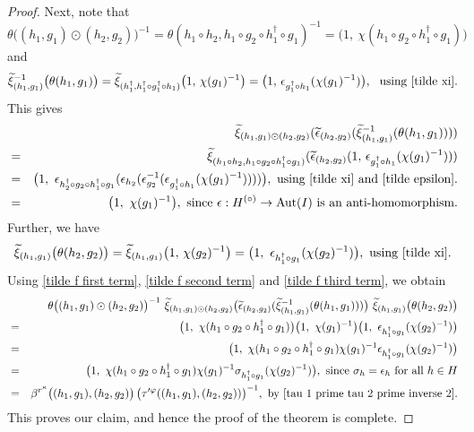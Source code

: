 \documentclass{jonasart}
\theoremstyle{plain}
\DeclareMathOperator{\Aut}{Aut}
\begin{document}
\begin{proof}
		Next, note that
		\begin{equation}\label{tilde f first term}
			\theta \big((h_1,g_1)\odot(h_2,g_2)\big)^{-1}=\theta(h_1\circ h_2,h_1\circ g_2\circ h_1^\dagger \circ g_1)^{-1}= \big(1, ~ \chi(h_1\circ g_2\circ h_1^\dagger \circ g_1)\big)
		\end{equation}
		and
		$$\widetilde{\xi}^{-1}_{(h_1,g_1)} \big(\theta(h_1,g_1)\big)= \widetilde{\xi}_{(h_1^\dagger,h_1^\dagger \circ g_1^\dagger\circ h_1)} \big(1,\, \chi(g_1)^{-1}\big)=
		\big(1,\,\epsilon_{g_1^\dagger\circ h_1}(\chi(g_1)^{-1}) \big),~~\text{using \eqref{tilde xi}.}
		$$
		This gives
		\begin{eqnarray}
			&& \widetilde{\xi}_{(h_1,g_1)\odot(h_2,g_2)}(\widetilde{\epsilon}_{(h_2,g_2)}(\widetilde{\xi}^{-1}_{(h_1,g_1)}(\theta(h_1,g_1)))) \nonumber\\
			&=&\widetilde{\xi}_{(h_1\circ h_2,h_1\circ g_2\circ h_1^\dagger \circ g_1)}(\widetilde{\epsilon}_{(h_2,g_2)}(1,\,\epsilon_{g_1^\dagger\circ h_1}(\chi(g_1)^{-1})))\nonumber\\
			&=&\big(1, ~ \epsilon_{h_2^\dagger\circ g_2\circ h_1^\dagger\circ g_1}(\epsilon_{h_2}(\epsilon^{-1}_{g_2}( \epsilon_{g_1^\dagger\circ h_1}(\chi(g_1)^{-1}))))\big),~\text{using \eqref{tilde xi} and \eqref{tilde epsilon}.}\nonumber\\
			&=& \big(1, ~\chi(g_1)^{-1}\big),~\textrm{since $\epsilon : H^{(\circ)} \rightarrow \Aut(I)$ is an anti-homomorphism}.\label{tilde f second term}
		\end{eqnarray}
		Further, we have
		\begin{equation}\label{tilde f third term}
			\widetilde{\xi}_{(h_1,g_1)} \big(\theta(h_2,g_2)\big) =\widetilde{\xi}_{(h_1,g_1)} \big(1,\, \chi(g_2)^{-1} \big)=\big(1, ~ \epsilon_{h_1^\dagger\circ g_1}(\chi(g_2)^{-1})\big),\text{ using \eqref{tilde xi}.}
		\end{equation}
		Using \eqref{tilde f first term}, \eqref{tilde f second term} and \eqref{tilde f third term}, we obtain
		\begin{eqnarray*}
			&& \theta \big((h_1,g_1)\odot(h_2,g_2)\big)^{-1} ~ \widetilde{\xi}_{(h_1,g_1)\odot(h_2,g_2)} \big(\widetilde{\epsilon}_{(h_2,g_2)}(\widetilde{\xi}^{-1}_{(h_1,g_1)}(\theta(h_1,g_1)))\big) ~ \widetilde{\xi}_{(h_1,g_1)}\big(\theta(h_2,g_2)\big)\\
			&=& \big(1, ~ \chi(h_1\circ g_2\circ h_1^\dagger \circ g_1)\big) \big(1, ~\chi(g_1)^{-1}\big) \big(1, ~ \epsilon_{h_1^\dagger\circ g_1}(\chi(g_2)^{-1})\big)\\
			&=& \big(1, ~ \chi(h_1\circ g_2\circ h_1^\dagger \circ g_1) \chi(g_1)^{-1} \epsilon_{h_1^\dagger\circ g_1}(\chi(g_2)^{-1})\big)\\
			&=& \big(1, ~ \chi(h_1\circ g_2\circ h_1^\dagger \circ g_1) \chi(g_1)^{-1} \sigma_{h_1^\dagger\circ g_1}(\chi(g_2)^{-1})\big), ~\textrm{since $\sigma_h=\epsilon_h$ for all $h\in H$}\\
			&=& \beta^{r^\kappa} \big((h_1,g_1),(h_2,g_2) \big)\,  \big(\tau'^\varphi((h_1,g_1),(h_2,g_2)) \big)^{-1}, ~\textrm{by \eqref{tau 1 prime tau 2 prime inverse 2}}.
		\end{eqnarray*}
		This proves our claim, and hence the proof of the theorem is complete.
	\end{proof}
\end{document}
